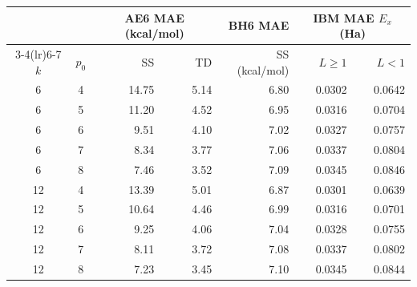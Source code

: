 \begin{tabular}{@{}cc rrr rr@{}}
\toprule
 & & \multicolumn{2}{c}{AE6 MAE (kcal/mol)} & BH6 MAE & \multicolumn{2}{c}{IBM MAE $E_x$ (Ha)} \\
\cmidrule(lr){3-4}\cmidrule(lr){6-7}
$k$ & $p_0$ & SS & TD & SS (kcal/mol) & $L\geq1$ & $L<1$ \\
\midrule
6 & 4 & \textcolor{pyscfred}{14.75} & \textcolor{pyscfred}{5.14} & \textcolor{pyscfred}{6.80} & \textcolor{pyscfred}{0.0302} & \textcolor{pyscfred}{0.0642} \\
6 & 5 & \textcolor{pyscfred}{11.20} & \textcolor{pyscfred}{4.52} & \textcolor{pyscfred}{6.95} & \textcolor{pyscfred}{0.0316} & \textcolor{pyscfred}{0.0704} \\
6 & 6 & \textcolor{pyscfred}{9.51} & \textcolor{pyscfred}{4.10} & \textcolor{pyscfred}{7.02} & \textcolor{pyscfred}{0.0327} & \textcolor{pyscfred}{0.0757} \\
6 & 7 & \textcolor{pyscfred}{8.34} & \textcolor{pyscfred}{3.77} & \textcolor{pyscfred}{7.06} & \textcolor{pyscfred}{0.0337} & \textcolor{pyscfred}{0.0804} \\
6 & 8 & \textcolor{pyscfred}{7.46} & \textcolor{pyscfred}{3.52} & \textcolor{pyscfred}{7.09} & \textcolor{pyscfred}{0.0345} & \textcolor{pyscfred}{0.0846} \\
\midrule
12 & 4 & \textcolor{pyscfred}{13.39} & \textcolor{pyscfred}{5.01} & \textcolor{pyscfred}{6.87} & \textcolor{pyscfred}{0.0301} & \textcolor{pyscfred}{0.0639} \\
12 & 5 & \textcolor{pyscfred}{10.64} & \textcolor{pyscfred}{4.46} & \textcolor{pyscfred}{6.99} & \textcolor{pyscfred}{0.0316} & \textcolor{pyscfred}{0.0701} \\
12 & 6 & \textcolor{pyscfred}{9.25} & \textcolor{pyscfred}{4.06} & \textcolor{pyscfred}{7.04} & \textcolor{pyscfred}{0.0328} & \textcolor{pyscfred}{0.0755} \\
12 & 7 & \textcolor{pyscfred}{8.11} & \textcolor{pyscfred}{3.72} & \textcolor{pyscfred}{7.08} & \textcolor{pyscfred}{0.0337} & \textcolor{pyscfred}{0.0802} \\
12 & 8 & \textcolor{pyscfred}{7.23} & \textcolor{pyscfred}{3.45} & \textcolor{pyscfred}{7.10} & \textcolor{pyscfred}{0.0345} & \textcolor{pyscfred}{0.0844} \\
\bottomrule
\end{tabular}
